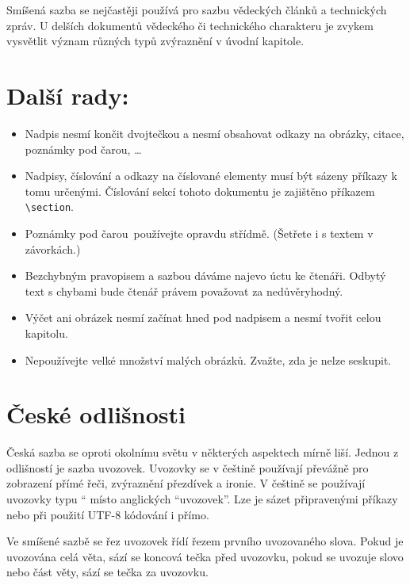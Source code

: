 \documentclass[twocolumn]{article}
\newcommand{\myuv}[1]{\quotedblbase #1\textquotedblleft}
\begin{document}
Smíšená sazba se nejčastěji používá pro sazbu vědeckých článků a technických zpráv.
U delších dokumentů vědeckého či technického charakteru je zvykem vysvětlit význam různých typů zvýraznění v úvodní kapitole.


\section{Další rady:}

\begin{itemize}
    \item Nadpis nesmí končit dvojtečkou a nesmí obsahovat odkazy na obrázky, citace, poznámky pod čarou, \dots

    \item Nadpisy, číslování a odkazy na číslované elementy musí být sázeny příkazy k tomu určenými.
    Číslování sekcí tohoto dokumentu je zajištěno příkazem \verb|\section|.

    \item Poznámky pod čarou\footnotemark \  používejte opravdu střídmě.
    (Šetřete i s textem v závorkách.)

    \item Bezchybným pravopisem a sazbou dáváme najevo úctu ke čtenáři.
    Odbytý text s chybami bude čtenář právem považovat za nedůvěryhodný.

    \item Výčet ani obrázek nesmí začínat hned pod nadpisem a nesmí tvořit celou kapitolu.

    \item Nepoužívejte velké množství malých obrázků.
    Zvažte, zda je nelze seskupit.
\end{itemize}

\section{České odlišnosti}

Česká sazba se oproti okolnímu světu v některých aspektech mírně liší.
Jednou z odlišností je sazba uvozovek.
Uvozovky se v češtině používají převážně pro zobrazení přímé řeči, zvýraznění přezdívek a ironie.
V češtině se používají uvozovky typu \myuv{9966} místo anglických “uvozovek”.
Lze je sázet připravenými příkazy nebo při použití UTF-8 kódování i přímo.

Ve smíšené sazbě se řez uvozovek řídí řezem prvního uvozovaného slova.
Pokud je uvozována celá věta, sází se koncová tečka před uvozovku, pokud se uvozuje slovo nebo část věty, sází se tečka za uvozovku.
\end{document}
